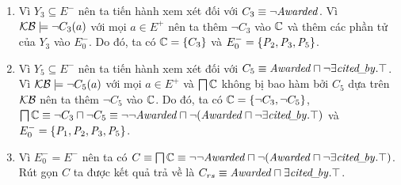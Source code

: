 \begin{Example}
\begin{enumerate}
		\item Vì $Y_3 \subseteq E^-$ nên ta tiến hành xem xét đối với $C_3 \equiv \neg\mathit{Awarded}$. Vì $\mathcal{KB} \models \neg C_3(a)$ với mọi $a \in E^+$ nên ta thêm $\neg C_3$ vào $\mathbb{C}$ và thêm các phần tử của $Y_3$ vào $E^-_0$. Do đó, ta có $\mathbb{C} = \{C_3\}$ và $E^-_0 = \{\mathit{P}_2,\mathit{P}_3,\mathit{P}_5\}$.
		
		\item Vì $Y_5 \subseteq E^-$ nên ta tiến hành xem xét đối với $C_5 \equiv \mathit{Awarded} \sqcap \neg\exists\mathit{cited\!\_\!by}.\top$. Vì $\mathcal{KB} \models \neg C_5(a)$ với mọi $a \in E^+$ và $\bigsqcap\mathbb{C}$ không bị bao hàm bởi $C_5$ dựa trên $\mathcal{KB}$ nên ta thêm $\neg C_5$ vào $\mathbb{C}$. Do đó, ta có $\mathbb{C} = \{\neg C_3, \neg C_5\}$, $\bigsqcap\mathbb{C} \equiv \neg C_3 \sqcap \neg C_5 \equiv \neg\neg\mathit{Awarded} \sqcap \neg (\mathit{Awarded} \sqcap \neg\exists\mathit{cited\!\_\!by}.\top)$ và $E^-_0 = \{\mathit{P}_1,\mathit{P}_2,\mathit{P}_3,\mathit{P}_5\}$.
		
		\item Vì $E^-_0 = E^-$ nên ta có $C \equiv \bigsqcap\mathbb{C} \equiv \neg\neg\mathit{Awarded} \sqcap \neg(\mathit{Awarded} \sqcap \neg \exists\mathit{cited\!\_\!by}.\top)$. Rút gọn $C$ ta được kết quả trả về là $C_{rs} \equiv \mathit{Awarded} \sqcap \exists\mathit{cited\!\_\!by}.\top$.\myend  
	\end{enumerate}
\end{Example}

